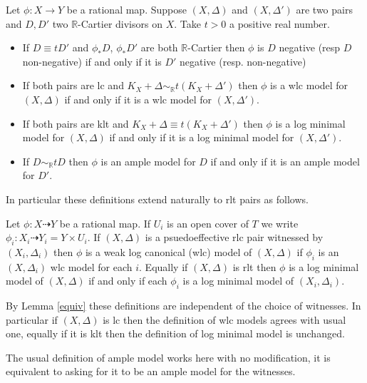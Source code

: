 \documentclass[a4paper,12pt]{amsart}
\begin{document}
	\begin{lemma}\label{equiv}\cite[Lemma 3.6.8]{birkar2010existence}
		Let $\phi:X \to Y$ be a rational map. Suppose $(X,\Delta)$ and $(X,\Delta')$ are two pairs and $D,D'$ two $\mathbb{R}$-Cartier divisors on $X$. Take $t >0$ a positive real number.
		\begin{itemize}
			\item If $D \equiv tD'$ and $\phi_{*}D$, $\phi_{*}D'$ are both $\mathbb{R}$-Cartier then $\phi$ is $D$ negative (resp $D$ non-negative) if and only if it is $D'$ negative (resp. non-negative)
			\item If both pairs are lc and $K_{X}+\Delta \sim_{\mathbb{R}} t(K_{X}+\Delta')$ then $\phi$ is a wlc model for $(X,\Delta)$ if and only if it is a wlc model for $(X,\Delta')$.
			\item If both pairs are klt and $K_{X}+\Delta \equiv t(K_{X}+\Delta')$ then $\phi$ is a log minimal model for $(X,\Delta)$ if and only if it is a log minimal model for $(X,\Delta')$.
			\item If $D\sim_{\mathbb{R}} tD$ then $\phi$ is an ample model for $D$ if and only if it is an ample model for $D'$.
		\end{itemize}
	\end{lemma}
	
	In particular these definitions extend naturally to rlt pairs as follows.
	
	
	\begin{definition}
		Let $\phi:X \dashrightarrow Y$ be a rational map. If $U_{i}$ is an open cover of $T$ we write $\phi_{i}:X_{i}\dashrightarrow Y_{i}=Y\times U_{i}$.
		If $(X,\Delta)$ is a psuedoeffective rlc pair witnessed by $(X_{i},\Delta_{i})$ then $\phi$ is a weak log canonical (wlc) model of $(X,\Delta)$ if $\phi_{i}$ is an $(X,\Delta_{i})$ wlc model for each $i$. Equally if $(X,\Delta)$ is rlt then $\phi$ is a log minimal model of $(X,\Delta)$ if and only if each $\phi_{i}$ is a log minimal model of $(X_{i},\Delta_{i})$.
	\end{definition}
	
	By Lemma \ref{equiv} these definitions are independent of the choice of witnesses. In particular if $(X,\Delta)$ is lc then the definition of wlc models agrees with usual one, equally if it is klt then the definition of log minimal model is unchanged.
	
	\begin{remark}
		The usual definition of ample model works here with no modification, it is equivalent to asking for it to be an ample model for the witnesses.
	\end{remark}
	
\end{document}
